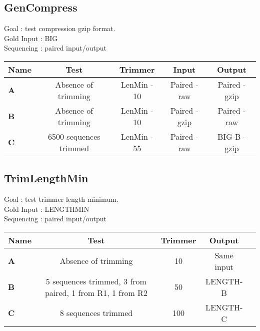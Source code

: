 \documentclass{article}
\begin{document}
\subsection{GenCompress}
Goal : test compression gzip format.\\
Gold Input : BIG\\
Sequencing : paired input/output
\begin{table}[H]
\begin{tabular}{|l|c|c|c|c|} \hline
    \textbf{Name} & \textbf{Test} & \textbf{Trimmer} & \textbf{Input} & \textbf{Output}\\ \hline
    \textbf{A} & Absence of trimming & LenMin - 10 & Paired - raw & Paired - gzip\\ \hline
    \textbf{B} & Absence of trimming & LenMin - 10 & Paired - gzip & Paired - raw\\ \hline
    \textbf{C} & 6500 sequences trimmed & LenMin - 55 & Paired - raw & BIG-B - gzip\\ \hline
\end{tabular}
\end{table}

\subsection{TrimLengthMin}
Goal : test trimmer length minimum.\\
Gold Input : LENGTHMIN\\
Sequencing : paired input/output
\begin{table}[H]
\begin{tabular}{|l|c|c|c|c|} \hline
    \textbf{Name} & \textbf{Test} & \textbf{Trimmer} & \textbf{Output} \\ \hline
    \textbf{A} & Absence of trimming & 10 & Same input \\ \hline
    \textbf{B} & 5 sequences trimmed, 3 from paired, 1 from R1, 1 from R2 & 50 & LENGTH-B\\ \hline
    \textbf{C} & 8 sequences trimmed & 100 & LENGTH-C\\ \hline
\end{tabular}
\end{table}
\end{document}

